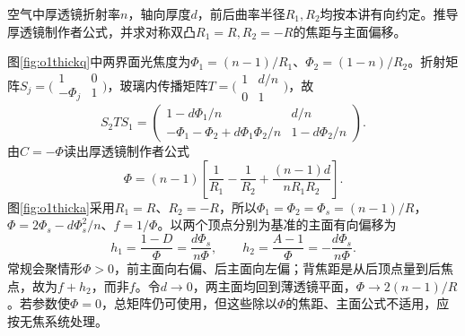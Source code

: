 \begin{example}\label{ex:o1thicklens}
空气中厚透镜折射率$n$，轴向厚度$d$，前后曲率半径$R_1,R_2$均按本讲有向约定。推导厚透镜制作者公式，并求对称双凸$R_1=R,R_2=-R$的焦距与主面偏移。
\end{example}
\begin{solution}
图\ref{fig:o1thickq}中两界面光焦度为$\Phi_1=(n-1)/R_1$、$\Phi_2=(1-n)/R_2$。折射矩阵$S_j=\bigl(\begin{smallmatrix}1&0\\-\Phi_j&1\end{smallmatrix}\bigr)$，玻璃内传播矩阵$T=\bigl(\begin{smallmatrix}1&d/n\\0&1\end{smallmatrix}\bigr)$，故
\[
 S_2TS_1=\begin{pmatrix}
 1-d\Phi_1/n&d/n\\
 -\Phi_1-\Phi_2+d\Phi_1\Phi_2/n&1-d\Phi_2/n
 \end{pmatrix}.
\]
由$C=-\Phi$读出厚透镜制作者公式
\[
 \Phi=(n-1)\left[\frac1{R_1}-\frac1{R_2}
 +\frac{(n-1)d}{nR_1R_2}\right].
\]
图\ref{fig:o1thicka}采用$R_1=R$、$R_2=-R$，所以$\Phi_1=\Phi_2=\Phi_s=(n-1)/R$，$\Phi=2\Phi_s-d\Phi_s^2/n$、$f=1/\Phi$。以两个顶点分别为基准的主面有向偏移为
\[
 h_1=\frac{1-D}\Phi=\frac{d\Phi_s}{n\Phi},\qquad
 h_2=\frac{A-1}\Phi=-\frac{d\Phi_s}{n\Phi}.
\]
常规会聚情形$\Phi>0$，前主面向右偏、后主面向左偏；背焦距是从后顶点量到后焦点，故为$f+h_2$，而非$f$。令$d\to0$，两主面均回到薄透镜平面，$\Phi\to2(n-1)/R$。若参数使$\Phi=0$，总矩阵仍可使用，但这些除以$\Phi$的焦距、主面公式不适用，应按无焦系统处理。
\end{solution}

